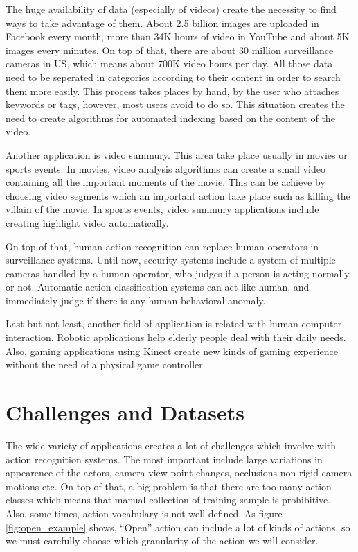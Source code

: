 \documentclass{report}
\begin{document}
The huge availability of data (especially of videos) create the  necessity to find ways to take advantage of them.
About 2.5 billion images are uploaded in Facebook every month, more than 34K hours of video in YouTube and
about 5K images every minutes. On top of that, there are about 30 million surveillance cameras in US, which means
about 700K video hours per day. All those data need to be seperated in categories according to their content in
order to search them more easily. This process takes places by hand, by the user who attaches
keywords or tags, however, most users avoid to do so. This situation creates the need to create algorithms for
automated indexing based on the content of the video.

Another application is video summury. This area take place usually in movies or sports events. In movies,
video analysis algorithms can create a small video containing all the important moments of the movie. This
can be achieve by choosing video segments which an important action take place such as killing the villain
of the movie. In sports events, video summury applications include creating highlight video automatically.

On top of that, human action recognition can replace human operators in surveillance systems. Until now,
security systems include a system of multiple cameras handled by a human operator, who judges if a person
is acting normally or not. Automatic action classification systems can act like human, and immediately
judge if there is any human behavioral anomaly.

Last but not least, another field of application is related with human-computer interaction. Robotic applications
help elderly people deal with their daily needs. Also, gaming applications using Kinect create new kinds of
gaming experience without the need of a physical game controller.

\section{Challenges and Datasets}
The wide variety of applications creates a lot of challenges which involve with action recognition systems.
The most important include large variations in appearence of the actors, camera view-point changes, occlusions
non-rigid camera motions etc. On top of that, a big problem is that there are too many action classes which means
that manual collection of training sample is prohibitive. Also, some times, action vocabulary is not well defined.
As figure \ref{fig:open_example} shows, ``Open'' action can include a lot of kinds of actions, so we must carefully
choose which granularity of the action we will consider.
\end{document}
